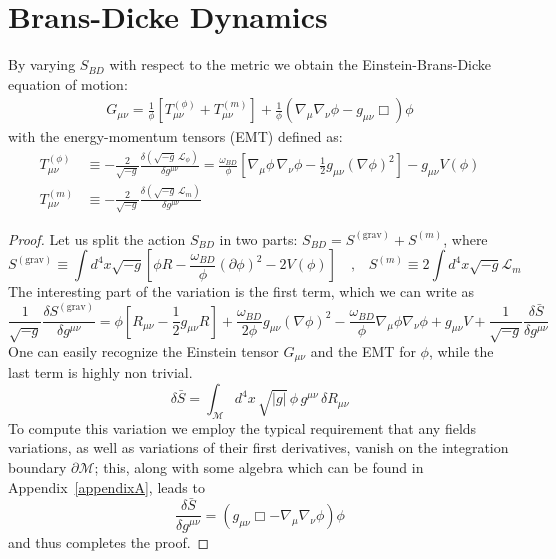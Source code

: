 \section{Brans-Dicke Dynamics}
By varying $S_{BD}$ with respect to the metric we obtain the Einstein-Brans-Dicke equation of motion:
\begin{equation}\label{eq:EBD}
    \begin{aligned}
        G_{\mu\nu} = \frac{1}{\phi} \left[ T_{\mu\nu}^{(\phi)}+ T_{\mu\nu}^{(m)}\right]+ \frac{1}{\phi} \left( \nabla_\mu \nabla_\nu \phi - g_{\mu\nu} \Box  \right) \phi 
    \end{aligned}
\end{equation}
with the energy-momentum tensors (EMT) defined as:
\begin{align}
    T^{(\phi)}_{\mu\nu} &\equiv -\frac{2}{\sqrt{-g}} \frac{\delta\!\left( \sqrt{-g}\,\mathcal{L}_{\phi} \right)}{\delta g^{\mu\nu}} = \frac{\omega_{BD}}{\phi} \left[ \nabla_\mu \phi \, \nabla_\nu \phi - \frac{1}{2} g_{\mu\nu} (\nabla \phi)^2 \right] - g_{\mu\nu} V(\phi) \\[6pt]
T^{(m)}_{\mu\nu} &\equiv -\frac{2}{\sqrt{-g}} \frac{\delta\!\left( \sqrt{-g}\,\mathcal{L}_m \right)}{\delta g^{\mu\nu}}
\end{align}
\begin{proof}\label{proof:BD}
    Let us split the action $S_{BD}$ in two parts: $ S_{BD} = S^{(\text{grav})}+S^{(m)} $, where
\begin{equation*}
  S^{(\text{grav})} \equiv \int d^4x \sqrt{-g} \left[  \phi R - \frac{\omega_{BD}}{\phi} \left(\partial \phi \right)^2- 2V(\phi)\right] \quad \text{,} \quad S^{(m)} \equiv 2\int d^4x \sqrt{-g} \mathcal{L}_{m}
\end{equation*}
The interesting part of the variation is the first term, which we can write as
    \begin{equation*}
   \frac{1}{\sqrt{-g}}\frac{\delta S^{(\text{grav})}}{\delta g^{\mu\nu}}=\phi \left[R_{\mu\nu}  - \frac{1}{2}g_{\mu\nu}R \right] + \frac{\omega_{BD}}{2\phi}g_{\mu\nu}(\nabla \phi)^2  -  \frac{\omega_{BD}}{\phi}\nabla_\mu \phi \nabla_\nu \phi + g_{\mu\nu} V + \frac{1}{\sqrt{-g}}\frac{\delta \bar{S}}{\delta g^{\mu\nu}}
    \end{equation*}
    One can easily recognize the Einstein tensor $G_{\mu\nu}$ and the EMT for $\phi$, while the last term is highly non trivial.
    \begin{equation*}
        \delta \bar{S} = \int_{\mathcal{M}} d^{4}x \,\sqrt{|g|}\,\phi\, g^{\mu\nu}\,\delta R_{\mu\nu}
    \end{equation*}
    To compute this variation we employ the typical requirement that any fields variations, as well as variations of their first derivatives, vanish
    on the integration boundary $\partial \mathcal{M}$; this, along with some algebra which can be found in Appendix~\ref{appendixA}, leads to
    \begin{equation*}
        \frac{\delta \bar{S}}{\delta g^{\mu\nu}} = \left(  g_{\mu\nu} \Box  - \nabla_\mu \nabla_\nu \phi \right) \phi 
    \end{equation*}
    and thus completes the proof.
\end{proof}

